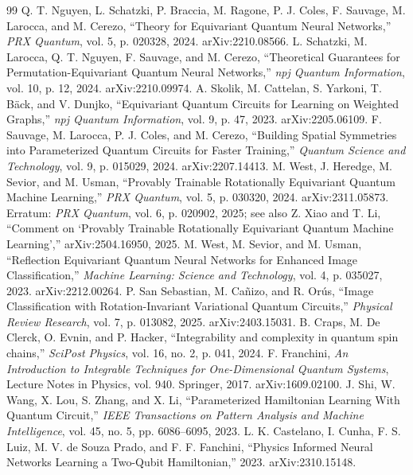 \documentclass[11pt]{article}
\begin{document}
\begin{thebibliography}{99}
 Q. T. Nguyen, L. Schatzki, P. Braccia, M. Ragone, P. J. Coles, F. Sauvage, M. Larocca, and M. Cerezo, ``Theory for Equivariant Quantum Neural Networks,'' \textit{PRX Quantum}, vol. 5, p. 020328, 2024. arXiv:2210.08566.
 L. Schatzki, M. Larocca, Q. T. Nguyen, F. Sauvage, and M. Cerezo, ``Theoretical Guarantees for Permutation-Equivariant Quantum Neural Networks,'' \textit{npj Quantum Information}, vol. 10, p. 12, 2024. arXiv:2210.09974.
 A. Skolik, M. Cattelan, S. Yarkoni, T. B\"ack, and V. Dunjko, ``Equivariant Quantum Circuits for Learning on Weighted Graphs,'' \textit{npj Quantum Information}, vol. 9, p. 47, 2023. arXiv:2205.06109.
 F. Sauvage, M. Larocca, P. J. Coles, and M. Cerezo, ``Building Spatial Symmetries into Parameterized Quantum Circuits for Faster Training,'' \textit{Quantum Science and Technology}, vol. 9, p. 015029, 2024. arXiv:2207.14413.
 M. West, J. Heredge, M. Sevior, and M. Usman, ``Provably Trainable Rotationally Equivariant Quantum Machine Learning,'' \textit{PRX Quantum}, vol. 5, p. 030320, 2024. arXiv:2311.05873. Erratum: \textit{PRX Quantum}, vol. 6, p. 020902, 2025; see also Z. Xiao and T. Li, ``Comment on `Provably Trainable Rotationally Equivariant Quantum Machine Learning','' arXiv:2504.16950, 2025.
 M. West, M. Sevior, and M. Usman, ``Reflection Equivariant Quantum Neural Networks for Enhanced Image Classification,'' \textit{Machine Learning: Science and Technology}, vol. 4, p. 035027, 2023. arXiv:2212.00264.
 P. San Sebastian, M. Ca\~{n}izo, and R. Or\'us, ``Image Classification with Rotation-Invariant Variational Quantum Circuits,'' \textit{Physical Review Research}, vol. 7, p. 013082, 2025. arXiv:2403.15031.
 B. Craps, M. De Clerck, O. Evnin, and P. Hacker, ``Integrability and complexity in quantum spin chains,'' \textit{SciPost Physics}, vol. 16, no. 2, p. 041, 2024.
 F. Franchini, \textit{An Introduction to Integrable Techniques for One-Dimensional Quantum Systems}, Lecture Notes in Physics, vol. 940. Springer, 2017. arXiv:1609.02100.
 J. Shi, W. Wang, X. Lou, S. Zhang, and X. Li, ``Parameterized Hamiltonian Learning With Quantum Circuit,'' \textit{IEEE Transactions on Pattern Analysis and Machine Intelligence}, vol. 45, no. 5, pp. 6086--6095, 2023.
 L. K. Castelano, I. Cunha, F. S. Luiz, M. V. de Souza Prado, and F. F. Fanchini, ``Physics Informed Neural Networks Learning a Two-Qubit Hamiltonian,'' 2023. arXiv:2310.15148.

\end{thebibliography}
\end{document}
